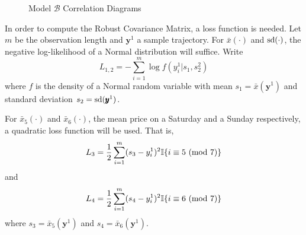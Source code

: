 \begin{figure}[H]
        \centering
        \qquad
        \caption{Model $\mathcal{B}$ Correlation Diagrams}
        \label{fig:smcd}
\end{figure}

In order to compute the Robust Covariance Matrix, a loss function is needed. Let $m$ be the observation length and $\pmb{y}^1$ a sample trajectory. For $\bar{x}(\cdot)$ and $\mathop{}\!\text{sd}{(\cdot)}$, the negative log-likelihood of a Normal distribution will suffice. Write
\begin{equation}
    L_{1,2} = -\sum_{i=1}^m \log{f(y^1_i | s_1, s_2^2)}
\end{equation}
where $f$ is the density of a Normal random variable with mean $s_1 = \bar{x}(\pmb{y}^1)$ and standard deviation $s_2 = \mathop{}\!\text{sd}{(\pmb{y}^1})$.

For $\bar{x}_5(\cdot)$ and $\bar{x}_6(\cdot)$, the mean price on a Saturday and a Sunday respectively, a quadratic loss function will be used. That is,
\begin{equation}
    L_3 = \frac{1}{2}\sum_{i=1}^m (s_3 - y^1_i)^2 \mathbb{I}\{i \equiv 5 \ (\mathrm{mod}\ 7)\}
\end{equation}
and
\begin{equation}
    L_4 = \frac{1}{2}\sum_{i=1}^m (s_4 - y^1_i)^2 \mathbb{I}\{i \equiv 6 \ (\mathrm{mod}\ 7)\}
\end{equation}
where $s_3 = \bar{x}_5(\pmb{y}^1)$ and $s_4 = \bar{x}_6(\pmb{y}^1)$.


